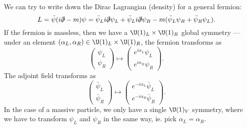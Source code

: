 \documentclass[a4paper]{article}
\begin{document}
\separator
We can try to write down the Dirac Lagrangian (density) for a general fermion:
\[
  L = \bar\psi (i \slashed{\partial} - m) \psi = \bar\psi_L i \slashed{\partial} \psi_L + \bar\psi_L i \slashed{\partial} \psi_R - m (\bar\psi_L \psi_R + \bar\psi_R \psi_L).
\]
If the fermion is massless, then we have a $\U(1)_L \times \U(1)_R$ global symmetry --- under an element $(\alpha_L, \alpha_R) \in \U(1)_L \times \U(1)_R$, the fermion transforms as
\[
  \begin{pmatrix}
    \psi_L\\
    \psi_R
  \end{pmatrix} \mapsto
  \begin{pmatrix}
    e^{i\alpha_L} \psi_L\\
    e^{i\alpha_R} \psi_R
  \end{pmatrix}.
\]
The adjoint field transforms as
\[
  \begin{pmatrix}
    \bar{\psi}_L\\
    \bar{\psi}_R
  \end{pmatrix} \mapsto
  \begin{pmatrix}
    e^{-i\alpha_L} \bar{\psi}_L\\
    e^{-i\alpha_R} \bar{\psi}_R
  \end{pmatrix}.
\]
In the case of a massive particle, we only have a single $\U(1)_V$ symmetry, where we have to transform $\psi_L$ and $\psi_R$ in the same way, ie. pick $\alpha_L = \alpha_R$.
\end{document}
